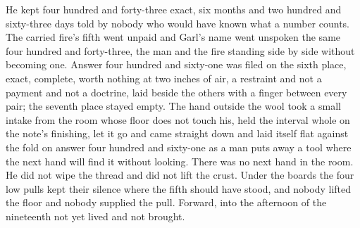 He kept four hundred and forty-three exact, six months and two hundred and sixty-three days told by nobody who would have known what a number counts. The carried fire's fifth went unpaid and Garl's name went unspoken the same four hundred and forty-three, the man and the fire standing side by side without becoming one. Answer four hundred and sixty-one was filed on the sixth place, exact, complete, worth nothing at two inches of air, a restraint and not a payment and not a doctrine, laid beside the others with a finger between every pair; the seventh place stayed empty. The hand outside the wool took a small intake from the room whose floor does not touch his, held the interval whole on the note's finishing, let it go and came straight down and laid itself flat against the fold on answer four hundred and sixty-one as a man puts away a tool where the next hand will find it without looking. There was no next hand in the room. He did not wipe the thread and did not lift the crust. Under the boards the four low pulls kept their silence where the fifth should have stood, and nobody lifted the floor and nobody supplied the pull. Forward, into the afternoon of the nineteenth not yet lived and not brought.
